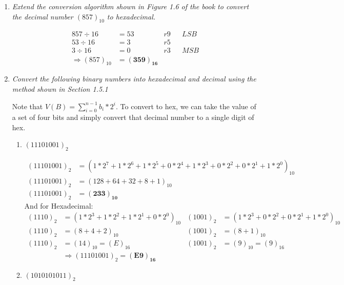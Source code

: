 \documentclass[12pt]{article}
\begin{document}
\begin{enumerate}
\begin{enumerate}
	\end{enumerate}

    \vspace{3mm}
	\item \textit{Extend the conversion algorithm shown in Figure 1.6 of the book to convert the decimal number $(857)_{10}$ to hexadecimal.}

	    \begin{align*}
    	857 \div 16 &= 53 &r9 &&LSB \\
        53 \div 16 &= 3 &r5 \\
        3 \div 16 &= 0 &r3 &&MSB \\
        \Rightarrow (857)_{10} &= \boxed{\mathbf{(359)_{16}}}
    	\end{align*}

    \vspace{3mm}
    \item \textit{Convert the following binary numbers into hexadecimal and decimal using the method shown in Section 1.5.1}

    Note that $V(B) = \sum\limits_{i=0}^{n-1}b_i*2^i$. To convert to hex, we can take the value of a set of four bits and simply convert that decimal number to a single digit of hex.

    \begin{enumerate}
    	\item \textit{$(11101001)_2$}

    	\begin{align*}
    	(11101001)_2&=(1*2^7+1*2^6+1*2^5+0*2^4+1*2^3+0*2^2+0*2^1+1*2^0)_{10} \\
        (11101001)_2&=(128 + 64 + 32 + 8 + 1)_{10} \\
        (11101001)_2&=\boxed{\mathbf{(233)_{10}}}
    	\end{align*}
    	And for Hexadecimal:
        \begin{align*}
        (1110)_2 &= (1*2^3+1*2^2+1*2^1+0*2^0)_{10} & (1001)_2 &= (1*2^3+0*2^2+0*2^1+1*2^0)_{10} \\
        (1110)_2 &= (8 + 4 + 2)_{10} & (1001)_2 &= (8 + 1)_{10} \\
        (1110)_2 &= (14)_{10} = (E)_{16} & (1001)_2 &= (9)_{10} = (9)_{16} \\
        &\Rightarrow(11101001)_2=\boxed{\mathbf{(E9)_{16}}}
        \end{align*}

    	\item \textit{$(1010101011)_2$}


\end{enumerate}
\end{enumerate}
\end{document}
